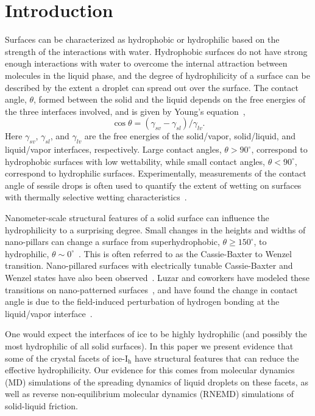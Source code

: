 \documentclass[aps,jcp,preprint,showpacs,superscriptaddress,groupedaddress]{revtex4}  %
\begin{document}
\section{Introduction}
Surfaces can be characterized as hydrophobic or hydrophilic
based on the strength of the interactions with water. Hydrophobic
surfaces do not have strong enough interactions with water to overcome
the internal attraction between molecules in the liquid phase, and the
degree of hydrophilicity of a surface can be described by the extent a
droplet can spread out over the surface. The contact angle, $\theta$,
formed between the solid and the liquid depends on the free energies
of the three interfaces involved, and is given by Young's
equation~\cite{Young05},
\begin{equation}\label{young}
\cos\theta = (\gamma_{sv} - \gamma_{sl})/\gamma_{lv} .
\end{equation} 
Here $\gamma_{sv}$, $\gamma_{sl}$, and $\gamma_{lv}$ are the free
energies of the solid/vapor, solid/liquid, and liquid/vapor interfaces,
respectively.  Large contact angles, $\theta > 90^{\circ}$, correspond
to hydrophobic surfaces with low wettability, while small contact
angles, $\theta < 90^{\circ}$, correspond to hydrophilic surfaces.
Experimentally, measurements of the contact angle of sessile drops is
often used to quantify the extent of wetting on surfaces with
thermally selective wetting
characteristics~\cite{Tadanaga00,Liu04,Sun04}.

Nanometer-scale structural features of a solid surface can influence
the hydrophilicity to a surprising degree.  Small changes in the
heights and widths of nano-pillars can change a surface from
superhydrophobic, $\theta \ge 150^{\circ}$, to hydrophilic, $\theta
\sim 0^{\circ}$~\cite{Koishi09}. This is often referred to as the
Cassie-Baxter to Wenzel transition.  Nano-pillared surfaces with
electrically tunable Cassie-Baxter and Wenzel states have also been
observed~\cite{Herbertson06,Dhindsa06,Verplanck07,Ahuja08,Manukyan11}.
Luzar and coworkers have modeled these transitions on nano-patterned
surfaces~\cite{Daub07,Daub10,Daub11,Ritchie12}, and have found the
change in contact angle is due to the field-induced perturbation of
hydrogen bonding at the liquid/vapor interface~\cite{Daub07}.

One would expect the interfaces of ice to be highly hydrophilic (and
possibly the most hydrophilic of all solid surfaces). In this paper we
present evidence that some of the crystal facets of ice-I$_\mathrm{h}$
have structural features that can reduce the effective hydrophilicity.
Our evidence for this comes from molecular dynamics (MD) simulations
of the spreading dynamics of liquid droplets on these facets, as well
as reverse non-equilibrium molecular dynamics (RNEMD) simulations of
solid-liquid friction.
\end{document}

